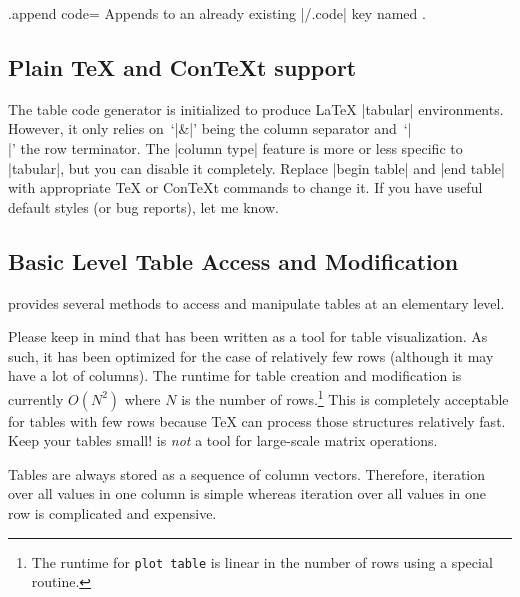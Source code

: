 \begin{handler}{{.append code}=}
    Appends  to an already existing |/.code| key named
    .
\end{handler}



\subsection{Plain \TeX{} and Con\TeX{}t support}
\label{sec:pgfplotstable:context}

The table code generator is initialized to produce \LaTeX{} |tabular|
environments. However, it only relies on~`|&|' being the column separator
and~`|\\|' the row terminator. The |column type| feature is more or less
specific to |tabular|, but you can disable it completely. Replace |begin table|
and |end table| with appropriate \TeX{} or Con\TeX{}t commands to change it. If
you have useful default styles (or bug reports), let me know.


\subsection{Basic Level Table Access and Modification}

\PGFPlotstable{} provides several methods to access and manipulate tables at an
elementary level.

Please keep in mind that \PGFPlotstable{} has been written as a tool for table
visualization. As such, it has been optimized for the case of relatively few
rows (although it may have a lot of columns). The runtime for table creation
and modification is currently $O(N^2)$ where $N$ is the number of
rows.\footnote{The runtime for \texttt{plot table} is linear in the number of
rows using a special routine.} This is completely acceptable for tables with
few rows because \TeX{} can process those structures relatively fast. Keep your
tables small! \PGFPlotstable{} is \emph{not} a tool for large-scale matrix
operations.

Tables are always stored as a sequence of column vectors. Therefore, iteration
over all values in one column is simple whereas iteration over all values in
one row is complicated and expensive.

